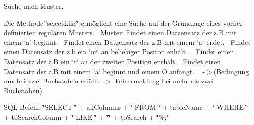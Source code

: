 Suche nach Muster. 

Die Methode \char`\"{}select\+Like\char`\"{} ermöglicht eine Suche auf der Grundlage eines vorher definierten regulären Musters.~\newline
 Muster\+: Findet einen Datzensatz der z.\+B mit einem \char`\"{}a\char`\"{} beginnt.~\newline
 Findet einen Datzensatz der z.\+B mit einem \char`\"{}a\char`\"{} endet.~\newline
 Findet einen Datensatz der z.\+b ein \char`\"{}or\char`\"{} an beliebiger Positon enhält. ~\newline
 Findet einen Datensatz der z.\+B ein \char`\"{}r\char`\"{} an der zweiten Position enthält.~\newline
 Findet einen Datensatz der z.\+B mit einem \char`\"{}a\char`\"{} beginnt und einem O anfängt. ~\newline
 -\/$>$(Bedingung nur bei zwei Buchstaben erfüllt -\/$>$ Fehlermeldung bei mehr als zwei Buchstaben)~\newline


S\+Q\+L-\/\+Befehl\+: \char`\"{}\+S\+E\+L\+E\+C\+T \char`\"{} + all\+Columns + \char`\"{} F\+R\+O\+M \char`\"{} + table\+Name + \char`\"{} W\+H\+E\+R\+E \char`\"{} + to\+Search\+Column + \char`\"{}  L\+I\+K\+E \char`\"{} + \char`\"{}\textquotesingle{}\char`\"{} + to\+Search + \char`\"{}\%\textquotesingle{};\char`\"{}



